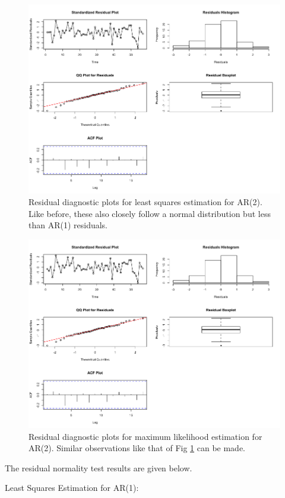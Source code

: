 \begin{enumerate}[label=(\alph*)]
\begin{figure}[!htb]
\end{figure}
\begin{figure}[!htb]
    \centering
    \includegraphics[width=\linewidth]{Images/P2/Residual_CSS_AR2.png}
    \caption[Residual diagnostic plots for least squares estimation for AR(2).]{Residual diagnostic plots for least squares estimation for AR(2). Like before, these also closely follow a normal distribution but less than AR(1) residuals.}
    \label{fig:residual_css_ar2}
\end{figure}
\begin{figure}[!htb]
    \centering
    \includegraphics[width=\linewidth]{Images/P2/Residual_ML_AR2.png}
    \caption[Residual diagnostic plots for maximum likelihood estimation for AR(2).]{Residual diagnostic plots for maximum likelihood estimation for AR(2). Similar observations like that of Fig \ref{fig:residual_css_ar2} can be made.}
\end{figure}
The residual normality test results are given below. \small\begin{block}
Least Squares Estimation for AR(1):


\end{block}
\end{enumerate}
